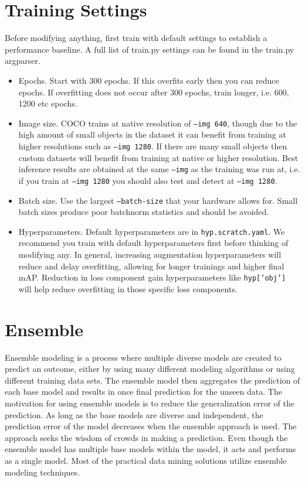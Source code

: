\section{Training Settings}
Before modifying anything, first train with default settings to establish a performance baseline. A full list of train.py settings can be found in the train.py argparser.
\begin{itemize}
\item Epochs. Start with 300 epochs. If this overfits early then you can reduce epochs. If overfitting does not occur after 300 epochs, train longer, i.e. 600, 1200 etc epochs.
\item Image size. COCO trains at native resolution of \texttt{--img 640}, though due to the high amount of small objects in the dataset it can benefit from training at higher resolutions such as \texttt{--img 1280}. If there are many small objects then custom datasets will benefit from training at native or higher resolution. Best inference results are obtained at the same \texttt{--img} as the training was run at, i.e. if you train at \texttt{--img 1280} you should also test and detect at \texttt{--img 1280}.
\item Batch size. Use the largest \texttt{--batch-size} that your hardware allows for. Small batch sizes produce poor batchnorm statistics and should be avoided.
\item Hyperparameters. Default hyperparameters are in \texttt{hyp.scratch.yaml}. We recommend you train with default hyperparameters first before thinking of modifying any. In general, increasing augmentation hyperparameters will reduce and delay overfitting, allowing for longer trainings and higher final mAP. Reduction in loss component gain hyperparameters like \texttt{hyp['obj']} will help reduce overfitting in those specific loss components.
\end{itemize}




\section{Ensemble}
Ensemble modeling is a process where multiple diverse models are created to predict an outcome, either by using many different modeling algorithms or using different training data sets. The ensemble model then aggregates the prediction of each base model and results in once final prediction for the unseen data. The motivation for using ensemble models is to reduce the generalization error of the prediction. As long as the base models are diverse and independent, the prediction error of the model decreases when the ensemble approach is used. The approach seeks the wisdom of crowds in making a prediction. Even though the ensemble model has multiple base models within the model, it acts and performs as a single model. Most of the practical data mining solutions utilize ensemble modeling techniques. \cite{KOTU201517}





